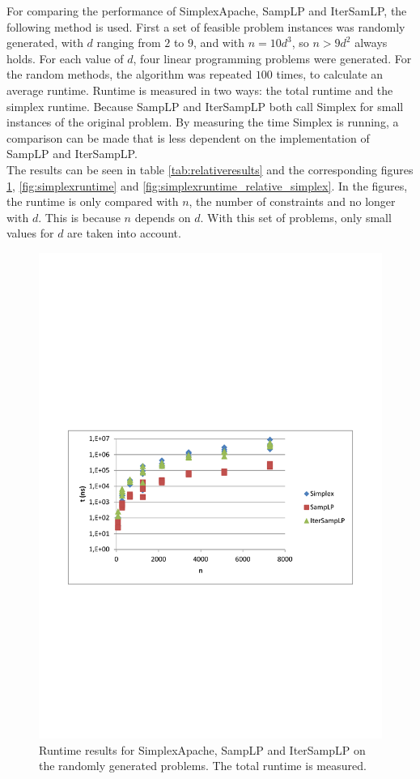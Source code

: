 \documentclass[nocopyrightspace]{acm_proc_article-sp}
\begin{document}
For comparing the performance of SimplexApache, SampLP and IterSamLP, the following method is used. First a set of feasible problem instances was randomly generated, with $d$ ranging from $2$ to $9$, and with $n = 10d^3$, so $n > 9d^2$ always holds. For each value of $d$, four linear programming problems were generated. For the random methods, the algorithm was repeated $100$ times, to calculate an average runtime. Runtime is measured in two ways: the total runtime and the simplex runtime. Because SampLP and IterSampLP both call Simplex for small instances of the original problem. By measuring the time Simplex is running, a comparison can be made that is less dependent on the implementation of SampLP and IterSampLP. \\
The results can be seen in table \ref{tab:relativeresults} and the corresponding figures \ref{fig:totalruntime}, \ref{fig:simplexruntime} and \ref{fig:simplexruntime_relative_simplex}. In the figures, the runtime is only compared with $n$, the number of constraints and no longer with $d$. This is because $n$ depends on $d$. With this set of problems, only small values for $d$ are taken into account.

\begin{figure}[h!]
\includegraphics[width=\columnwidth]{../Results/totalruntime.pdf}
\caption{Runtime results for SimplexApache, SampLP and IterSampLP on the randomly generated problems. The total runtime is measured.}
\label{fig:totalruntime}
\end{figure}
\end{document}
